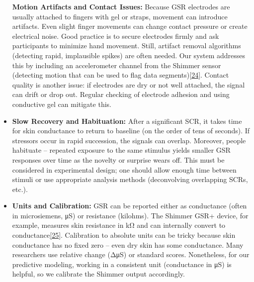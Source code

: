 \documentclass[12pt,a4paper]{article}
\begin{document}
\begin{itemize}
  \textbf{Motion Artifacts and Contact Issues:} Because GSR electrodes are usually attached to fingers with gel or straps, movement can introduce artifacts. Even slight finger movements can change contact pressure or create electrical noise. Good practice is to secure electrodes firmly and ask participants to minimize hand movement. Still, artifact removal algorithms (detecting rapid, implausible spikes) are often needed. Our system addresses this by including an accelerometer channel from the Shimmer sensor (detecting motion that can be used to flag data segments)\href{https://github.com/buccancs/bucika_gsr/blob/7048f7f6a7536f5cd577ed2184800d3dad97fd08/docs/architecture.md\#L201-L205}{{[}24{]}}. Contact quality is another issue: if electrodes are dry or not well attached, the signal can drift or drop out. Regular checking of electrode adhesion and using conductive gel can mitigate this.
\item
  \textbf{Slow Recovery and Habituation:} After a significant SCR, it takes time for skin conductance to return to baseline (on the order of tens of seconds). If stressors occur in rapid succession, the signals can overlap. Moreover, people habituate -- repeated exposure to the same stimulus yields smaller GSR responses over time as the novelty or surprise wears off. This must be considered in experimental design; one should allow enough time between stimuli or use appropriate analysis methods (deconvolving overlapping SCRs, etc.).
\item
  \textbf{Units and Calibration:} GSR can be reported either as conductance (often in microsiemens, μS) or resistance (kilohms). The Shimmer GSR+ device, for example, measures skin resistance in kΩ and can internally convert to conductance\href{https://github.com/buccancs/gsr_rgbt_project/blob/ea44d0298e0379541f112f76eb809976f3771fa3/docs/hardware.md\#L118-L126}{{[}25{]}}. Calibration to absolute units can be tricky because skin conductance has no fixed zero -- even dry skin has some conductance. Many researchers use relative change (ΔμS) or standard scores. Nonetheless, for our predictive modeling, working in a consistent unit (conductance in μS) is helpful, so we calibrate the Shimmer output accordingly.
\end{itemize}
\end{document}
